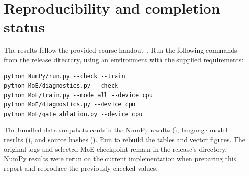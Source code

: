 \section*{Reproducibility and completion status}
The results follow the provided course handout~\citep{handout}. Run the following commands from the release directory, using an environment with the supplied requirements:
\begin{verbatim}
python NumPy/run.py --check --train
python MoE/diagnostics.py --check
python MoE/train.py --mode all --device cpu
python MoE/diagnostics.py --device cpu
python MoE/gate_ablation.py --device cpu
\end{verbatim}
The bundled data snapshots contain the NumPy results (), language-model results (), and source hashes (). Run  to rebuild the tables and vector figures. The original logs and selected MoE checkpoint remain in the release's  directory. NumPy results were rerun on the current implementation when preparing this report and reproduce the previously checked values.


